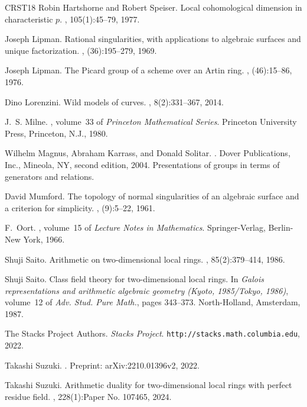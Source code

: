 \documentclass{amsart}
\theoremstyle{remark}
\numberwithin{equation}{section}
\begin{document}
\begin{thebibliography}{CRST18}
Robin Hartshorne and Robert Speiser.
\newblock Local cohomological dimension in characteristic {$p$}.
, 105(1):45--79, 1977.

Joseph Lipman.
\newblock Rational singularities, with applications to algebraic surfaces and
  unique factorization.
, (36):195--279, 1969.

Joseph Lipman.
\newblock The {P}icard group of a scheme over an {A}rtin ring.
, (46):15--86, 1976.

Dino Lorenzini.
\newblock Wild models of curves.
, 8(2):331--367, 2014.

J.~S. Milne.
, volume~33 of {\em Princeton Mathematical
  Series}.
\newblock Princeton University Press, Princeton, N.J., 1980.

Wilhelm Magnus, Abraham Karrass, and Donald Solitar.
.
\newblock Dover Publications, Inc., Mineola, NY, second edition, 2004.
\newblock Presentations of groups in terms of generators and relations.

David Mumford.
\newblock The topology of normal singularities of an algebraic surface and a
  criterion for simplicity.
, (9):5--22, 1961.

F.~Oort.
, volume~15 of {\em Lecture Notes in
  Mathematics}.
\newblock Springer-Verlag, Berlin-New York, 1966.

Shuji Saito.
\newblock Arithmetic on two-dimensional local rings.
, 85(2):379--414, 1986.

Shuji Saito.
\newblock Class field theory for two-dimensional local rings.
\newblock In {\em Galois representations and arithmetic algebraic geometry
  ({K}yoto, 1985/{T}okyo, 1986)}, volume~12 of {\em Adv. Stud. Pure Math.},
  pages 343--373. North-Holland, Amsterdam, 1987.

The {Stacks Project Authors}.
\newblock \textit{Stacks Project}.
\newblock \verb+http://stacks.math.columbia.edu+, 2022.

Takashi Suzuki.
.
\newblock Preprint: arXiv:2210.01396v2, 2022.

Takashi Suzuki.
\newblock Arithmetic duality for two-dimensional local rings with perfect
  residue field.
, 228(1):Paper No. 107465, 2024.

\end{thebibliography}
\end{document}
